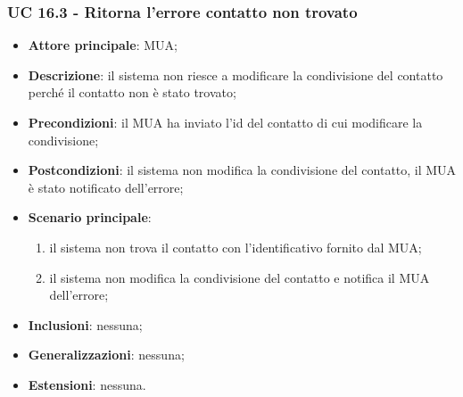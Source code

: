 \subsubsection{UC 16.3 - Ritorna l'errore contatto non trovato} \label{sec:UC16.3}
    \begin{itemize}
        \item \textbf{Attore principale}: MUA;
        \item \textbf{Descrizione}: il sistema non riesce a modificare la condivisione del contatto perché il contatto non è stato trovato;
        \item \textbf{Precondizioni}: il MUA ha inviato l'id del contatto di cui modificare la condivisione;
        \item \textbf{Postcondizioni}: il sistema non modifica la condivisione del contatto, il MUA è stato notificato dell'errore;
        \item \textbf{Scenario principale}:
            \begin{enumerate}
                \item il sistema non trova il contatto con l'identificativo fornito dal MUA;
                \item il sistema non modifica la condivisione del contatto e notifica il MUA dell'errore;
            \end{enumerate}
        \item \textbf{Inclusioni}: nessuna;
        \item \textbf{Generalizzazioni}: nessuna;
        \item \textbf{Estensioni}: nessuna.
    \end{itemize}

